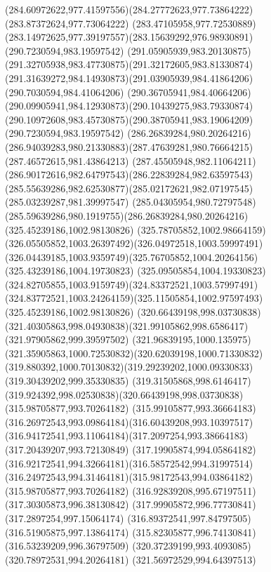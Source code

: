 {{		\curveto(284.60972622,977.41597556)(284.27772623,977.73864222)(283.87372624,977.73064222)
		\curveto(283.47105958,977.72530889)(283.14972625,977.39197557)(283.15639292,976.98930891)
		\moveto(290.7230594,983.19597542)
		\curveto(291.05905939,983.20130875)(291.32705938,983.47730875)(291.32172605,983.81330874)
		\curveto(291.31639272,984.14930873)(291.03905939,984.41864206)(290.7030594,984.41064206)
		\curveto(290.36705941,984.40664206)(290.09905941,984.12930873)(290.10439275,983.79330874)
		\curveto(290.10972608,983.45730875)(290.38705941,983.19064209)(290.7230594,983.19597542)
		\moveto(286.26839284,980.20264216)
		\curveto(286.94039283,980.21330883)(287.47639281,980.76664215)(287.46572615,981.43864213)
		\curveto(287.45505948,982.11064211)(286.90172616,982.64797543)(286.22839284,982.63597543)
		\curveto(285.55639286,982.62530877)(285.02172621,982.07197545)(285.03239287,981.39997547)
		\curveto(285.04305954,980.72797548)(285.59639286,980.1919755)(286.26839284,980.20264216)
		\moveto(325.45239186,1002.98130826)
		\curveto(325.78705852,1002.98664159)(326.05505852,1003.26397492)(326.04972518,1003.59997491)
		\curveto(326.04439185,1003.9359749)(325.76705852,1004.20264156)(325.43239186,1004.19730823)
		\curveto(325.09505854,1004.19330823)(324.82705855,1003.9159749)(324.83372521,1003.57997491)
		\curveto(324.83772521,1003.24264159)(325.11505854,1002.97597493)(325.45239186,1002.98130826)
		\moveto(320.66439198,998.03730838)
		\curveto(321.40305863,998.04930838)(321.99105862,998.6586417)(321.97905862,999.39597502)
		\curveto(321.96839195,1000.135975)(321.35905863,1000.72530832)(320.62039198,1000.71330832)
		\curveto(319.880392,1000.70130832)(319.29239202,1000.09330833)(319.30439202,999.35330835)
		\curveto(319.31505868,998.6146417)(319.924392,998.02530838)(320.66439198,998.03730838)
		\moveto(315.98705877,993.70264182)
		\curveto(315.99105877,993.36664183)(316.26972543,993.09864184)(316.60439208,993.10397517)
		\curveto(316.94172541,993.11064184)(317.2097254,993.38664183)(317.20439207,993.72130849)
		\curveto(317.19905874,994.05864182)(316.92172541,994.32664181)(316.58572542,994.31997514)
		\curveto(316.24972543,994.31464181)(315.98172543,994.03864182)(315.98705877,993.70264182)
		\moveto(316.92839208,995.67197511)
		\lineto(317.30305873,996.38130842)
		\lineto(317.99905872,996.77730841)
		\lineto(317.2897254,997.15064174)
		\lineto(316.89372541,997.84797505)
		\lineto(316.51905875,997.13864174)
		\lineto(315.82305877,996.74130841)
		\lineto(316.53239209,996.36797509)
		\closepath
		\moveto(320.37239199,993.4093085)
		\lineto(320.78972531,994.20264181)
		\lineto(321.56972529,994.64397513)
}}
